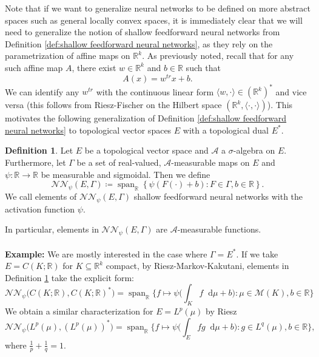 \documentclass[11pt,a4paper,twoside,openany]{report}
\numberwithin{equation}{section}
\newcommand{\diff}{\mathop{}\!\mathrm{d}}
\theoremstyle{plain} %
\theoremstyle{definition} %
\newtheorem{definition}[theorem]{Definition}
\theoremstyle{remark} %
\let\parencite\authnumparencite
\begin{document}
Note that if we want to generalize neural networks to be defined on more abstract spaces such as general locally convex spaces, it is immediately clear that we will need to generalize the notion of shallow feedforward neural networks from Definition \ref{def:shallow feedforward neural networks}, as they rely on the parametrization of affine maps on \(\mathbb{R}^k\). As previously noted, recall that for any such affine map \(A\), there exist \(w\in\mathbb{R}^k\) and \(b \in \mathbb{R}\) such that 
\begin{equation*}
    A(x)=w^{tr}x+b.
\end{equation*}
We can identify any \(w^{tr}\) with the continuous linear form \(\langle w,\cdot\rangle\in(\mathbb{R}^k)^*\) and vice versa (this follows from Riesz-Fischer \parencite[Cor.~4.3.2.]{Bogachev2007MeasureTheory} on the Hilbert space \((\mathbb{R}^k,\langle\cdot,\cdot\rangle)\)). This motivates the following generalization of Definition \ref{def:shallow feedforward neural networks} to topological vector spaces \(E\) with a topological dual \(E^*\).
\begin{definition}\label{def:NN on locally convex X}
    Let \(E\) be a topological vector space and \(\mathcal{A}\) a \(\sigma\)-algebra on \(E\). Furthermore, let \(\Gamma\) be a set of real-valued, \(\mathcal{A}\)-measurable maps on \(E\) and \(\psi:\mathbb{R}\to\mathbb{R}\) be measurable and sigmoidal. Then we define 
    \begin{equation*}
        \mathcal{NN}_{\psi}(E,\Gamma)\coloneqq\operatorname{span}_{\mathbb{R}}\left\{\psi(F(\cdot)+b):F\in \Gamma,b\in\mathbb{R}\right\}.
    \end{equation*}
    We call elements of \(\mathcal{NN}_{\psi}(E,\Gamma)\) shallow feedforward neural networks with the activation function \(\psi\).
\end{definition}
In particular, elements in \(\mathcal{NN}_{\psi}(E,\Gamma)\) are \(\mathcal{A}\)-measurable functions.
\\\\
\textbf{Example:} We are mostly interested in the case where \(\Gamma=E^*\). If we take \(E=C(K;\mathbb{R})\) for \(K\subseteq\mathbb{R}^k\) compact, by Riesz-Markov-Kakutani, elements in Definition \ref{def:NN on locally convex X} take the explicit form:
\begin{equation*}
     \mathcal{NN}_{\psi}\big(C(K;\mathbb{R}),C(K;\mathbb{R})^*\big)=\operatorname{span}_{\mathbb{R}}\bigg\{f\mapsto\psi\bigg(\int_K f\diff \mu+b\bigg):\mu\in\mathcal{M}(K),b\in\mathbb{R}\bigg\}
\end{equation*}
We obtain a similar characterization for \(E=L^p(\mu)\) by Riesz
\begin{equation*}
     \mathcal{NN}_{\psi}\big(L^p(\mu),(L^p(\mu))^*\big)=\operatorname{span}_{\mathbb{R}}\bigg\{f\mapsto\psi\bigg(\int_E fg\diff \mu+b\bigg):g\in L^q(\mu),b\in\mathbb{R}\bigg\},
\end{equation*}
where \(\frac{1}{p}+\frac{1}{q}=1\).
\end{document}
